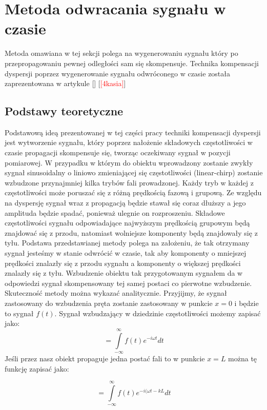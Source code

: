 \section{Metoda odwracania sygnału w czasie}
\label{sec:metoda_tr}

Metoda omawiana w tej sekcji polega na wygenerowaniu sygnału który po przepropagowaniu pewnej odległości sam się skompensuje. Technika kompensacji dyspersji poprzez wygenerowanie sygnału odwróconego w czasie została zaprezentowana w artykule [] [\textcolor{red}{[4kasia]}]

\subsection{Podstawy teoretyczne}
Podstawową ideą prezentowanej w tej części pracy techniki kompensacji dyspersji jest wytworzenie sygnału, który poprzez nałożenie składowych częstotliwości w czasie propagacji skompensuje się, tworząc oczekiwany sygnał w pozycji pomiarowej. W przypadku w którym do obiektu wprowadzony zostanie zwykły sygnał sinusoidalny o liniowo zmieniającej się częstotliwości (linear-chirp) zostanie wzbudzone przynajmniej kilka trybów fali prowadzonej. Każdy tryb w każdej z częstotliwości może poruszać się z różną prędkością fazową i grupową. Ze względu na dyspersję sygnał wraz z propagacją będzie stawał się coraz dłuższy a jego amplituda będzie spadać, ponieważ ulegnie on rozproszeniu.  Składowe częstotliwości sygnału odpowiadające najwyższym prędkością grupowym będą znajdować się z przodu, natomiast wolniejsze komponenty będą znajdowały się z tyłu. Podstawa przedstawianej metody polega na założeniu, że tak otrzymany sygnał jesteśmy w stanie odwrócić w czasie, tak aby komponenty o mniejszej prędkości znalazły się z przodu sygnału a komponenty o większej prędkości znalazły się z tyłu. Wzbudzenie obiektu tak przygotowanym sygnałem da w odpowiedzi sygnał skompensowany tej samej postaci co pierwotne wzbudzenie. Skuteczność metody można wykazać analitycznie. Przyjijmy, że sygnał zastosowany do wzbudzenia pręta zostanie zastosowany w punkcie $x = 0$ i będzie to sygnał $f(t)$. Sygnał wzbudzający w dziedzinie częstotliwości możemy zapisać jako:
\begin{equation}
[F(\omega)_{x=0}]=\int\limits_{-\infty}^{\infty}f(t)e^{-i\omega t}dt \label{eq:F(omega)_x=0}
\end{equation}
Jeśli przez nasz obiekt propaguje jedna postać fali to w punkcie $x=L$ można tę funkcję zapisać jako:

\begin{equation}
[F(\omega)_{x=L}]=\int\limits_{-\infty}^{\infty}f(t)e^{-i(\omega t - kL}dt \label{eq:F(omega)_x=L}
\end{equation}

